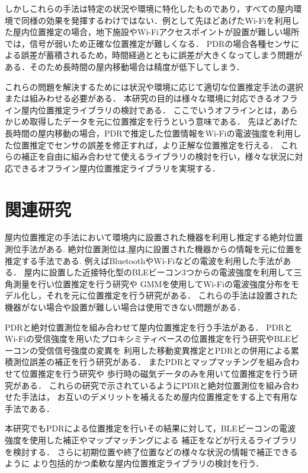 \documentclass[Japanese]{dicomopapers}
\begin{document}
しかしこれらの手法は特定の状況や環境に特化したものであり，すべての屋内環境で同様の効果を発揮するわけではない．例として先ほどあげたWi-Fiを利用した屋内位置推定の場合，地下施設やWi-Fiアクセスポイントが設置が難しい場所では，信号が弱いため正確な位置推定が難しくなる．
PDRの場合各種センサによる誤差が蓄積されるため，時間経過とともに誤差が大きくなってしまう問題がある．そのため長時間の屋内移動場合は精度が低下してしまう．

これらの問題を解決するためには状況や環境に応じて適切な位置推定手法の選択または組みわせる必要がある．
本研究の目的は様々な環境に対応できるオフライン屋内位置推定ライブラリの検討である．
ここでいうオフラインとは，あらかじめ取得したデータを元に位置推定を行うという意味である．
先ほどあげた長時間の屋内移動の場合，PDRで推定した位置情報をWi-Fiの電波強度を利用した位置推定でセンサの誤差を修正すれば，より正解な位置推定を行える．
これらの補正を自由に組み合わせて使えるライブラリの検討を行い，様々な状況に対応できるオフライン屋内位置推定ライブラリを実現する．

\section{関連研究}
屋内位置推定の手法において環境内に設置された機器を利用し推定する絶対位置測位手法がある.
絶対位置測位は,屋内に設置された機器からの情報を元に位置を推定する手法である.
例えばBluetoothやWi-Fiなどの電波を利用した手法がある．
屋内に設置した近接特化型のBLEビーコン3つからの電波強度を利用して三角測量を行い位置推定を行う研究\cite{ble-indoor}や
GMMを使用してWi-Fiの電波強度分布をモデル化し，それを元に位置推定を行う研究\cite{wifi-gmm}がある．
これらの手法は設置された機器がない場合や設置が難しい場合は使用できない問題がある．

PDRと絶対位置測位を組み合わせて屋内位置推定を行う手法がある．
PDRとWi-Fiの受信強度を用いたプロキシミティベースの位置推定を行う研究\cite{pdr-wifi}やBLEビーコンの受信信号強度の変異を
利用した移動変異推定とPDRとの併用による累積測位誤差の補正を行う研究\cite{pdr-ble}がある．
またPDRとマップマッチングを組み合わせて位置推定を行う研究\cite{pdr-map}や
歩行時の磁気データのみを用いて位置推定を行う研究\cite{pdr-mag}がある．
これらの研究で示されているようにPDRと絶対位置測位を組み合わせた手法は，
お互いのデメリットを補えるため屋内位置推定をする上で有用な手法である．

本研究でもPDRによる位置推定を行いその結果に対して，BLEビーコンの電波強度を使用した補正やマップマッチングによる
補正をなどが行えるライブラリを検討する．
さらに初期位置や終了位置などの様々な状況の情報で補正できるように
より包括的かつ柔軟な屋内位置推定ライブラリの検討を行う．
\end{document}
